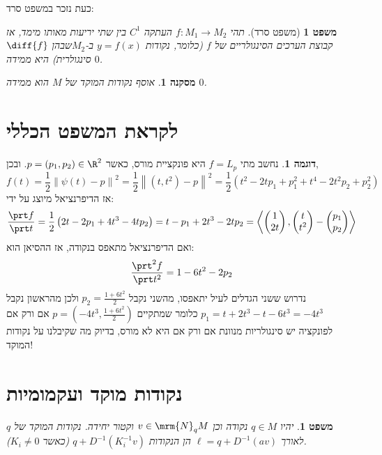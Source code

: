 \documentclass{article}
\newtheorem{theorem}{משפט}
\newtheorem{corollary}{מסקנה}
\newtheorem*{theorem*}{משפט}
\theoremstyle{definition}
\newtheorem*{example*}{דוגמה}
\newcommand{\norm}[1]{\left\lVert#1\right\rVert}
\begin{document}
	כעת נזכר במשפט סרד:
	\begin{theorem*}[משפט סרד]
		תהי
		\(f:M_1\to M_2\)
		העתקה
		\(C^1\)
		בין שתי יריעות מאותו מימד,
		אז קבוצת הערכים הסינגולריים של \(f\)
		(כלומר, נקודות \(y=f(x)\) ב-\(M_2\)שבהן \(\diff{f}\) סינגולרית)
		היא ממידה \(0\).
	\end{theorem*}

	\begin{corollary}\label{measure-zero}
		אוסף נקודות המוקד של \(M\) הוא ממידה \(0\).
	\end{corollary}




	\section{לקראת המשפט הכללי}
	\begin{example*}
		נחשב מתי
		\(f=L_p\)
		היא פונקציית מורס, כאשר
		\(p=(p_1,p_2)\in \R^2\).
		ובכן,
		\[
			f(t)
			=\frac{1}{2}\norm{\psi(t)-p}^2
			=\frac{1}{2}\norm{(t,t^2)-p}^2
			=\frac{1}{2}\left(t^2-2tp_1+p_1^2+t^4-2t^2p_2+p_2^2\right)
		\]
		אז הדיפרנציאל מיוצג על ידי:
		\[
			\frac{\prt f}{\prt t}
			=\frac{1}{2}\left(2t-2p_1+4t^3-4tp_2\right)
			=t-p_1+2t^3-2tp_2
			=\left\langle
				\begin{pmatrix}
					1 \\ 2t
				\end{pmatrix},
				\begin{pmatrix}
					t \\ t^2
				\end{pmatrix}
				-\begin{pmatrix}
				p_1 \\ p_2
				\end{pmatrix}
			\right\rangle
		\]
		ואם הדיפרנציאל מתאפס בנקודה, אז ההסיאן הוא:
		\[
			\frac{\prt^2 f}{\prt t^2}
			=1-6t^2-2p_2
		\]
		נדרוש ששני הגדלים לעיל יתאפסו, מהשני נקבל
		\(p_2=\frac{1+6t^2}{2}\)
		ולכן מהראשון נקבל
		\(p_1=t+2t^3-t-6t^3=-4t^3\)
		כלומר שמתקיים
		\(p=\left(-4t^3,\frac{1+6t^2}{2}\right)\)
		אם ורק אם לפונקציה יש סינגולריות מנוונת אם ורק אם היא לא מורס,
		בדיוק מה שקיבלנו על נקודות המוקד!
	\end{example*}




	\section{נקודות מוקד ועקמומיות}
	
	\begin{theorem}\label{focal-curvature}
		יהיו
		\(q\in M\)
		נקודה וכן
		\(v\in\mrm{N}_q M\)
		וקטור יחידה.
		נקודות המוקד של \(q\) לאורך
		\(\ell = q+D^{-1}(av)\)
		הן הנקודות
		\(q + D^{-1}(K_i^{-1} v)\)
		(כאשר \(K_i\neq 0\)).
	\end{theorem}
\end{document}
